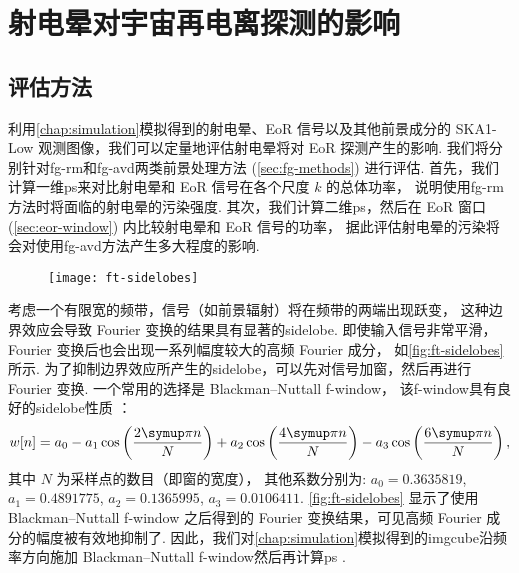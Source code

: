 
\chapter{射电晕对宇宙再电离探测的影响}
\label{chap:halo}

\section{评估方法}
\label{sec:eval-method}

利用\autoref{chap:simulation}模拟得到的射电晕、EoR 信号以及其他前景成分的
SKA1-Low 观测图像，我们可以定量地评估射电晕将对 EoR 探测产生的影响.
我们将分别针对\ac{fg-rm}和\ac{fg-avd}两类前景处理方法 (\autoref{sec:fg-methods})
进行评估.
首先，我们计算一维\ac{ps}来对比射电晕和 EoR 信号在各个尺度 $k$ 的总体功率，
说明使用\ac{fg-rm}方法时将面临的射电晕的污染强度.
其次，我们计算二维\ac{ps}，然后在 EoR 窗口 (\autoref{sec:eor-window})
内比较射电晕和 EoR 信号的功率，
据此评估射电晕的污染将会对使用\ac{fg-avd}方法产生多大程度的影响.

\begin{figure}[htp]
  \centering
  \texttt{[image: ft-sidelobes]}
  \label{fig:ft-sidelobes}
\end{figure}

考虑一个有限宽的频带，信号（如前景辐射）将在频带的两端出现跃变，
这种边界效应会导致 Fourier 变换的结果具有显著的\ac{sidelobe}.
即使输入信号非常平滑，Fourier 变换后也会出现一系列幅度较大的高频 Fourier 成分，
如\autoref{fig:ft-sidelobes} 所示.
为了抑制边界效应所产生的\ac{sidelobe}，可以先对信号加窗，然后再进行 Fourier 变换.
一个常用的选择是 Blackman--Nuttall \ac{f-window}，
该\ac{f-window}具有良好的\ac{sidelobe}性质 \cite{nuttall1981}：
\begin{equation}
  \label{eq:bn-window}
  w[n] = a_0 - a_1 \cos\left(\frac{2\Cpi n}{N}\right)
    + a_2 \cos\left(\frac{4\Cpi n}{N}\right)
    - a_3 \cos\left(\frac{6\Cpi n}{N}\right) ,
\end{equation}
其中
$N$ 为采样点的数目（即窗的宽度），
其他系数分别为:
$a_0 = \num{0.3635819}$,
$a_1 = \num{0.4891775}$,
$a_2 = \num{0.1365995}$,
$a_3 = \num{0.0106411}$.
\autoref{fig:ft-sidelobes} 显示了使用 Blackman--Nuttall \ac{f-window}
之后得到的 Fourier 变换结果，可见高频 Fourier 成分的幅度被有效地抑制了.
因此，我们对\autoref{chap:simulation}模拟得到的\ac{imgcube}沿频率方向施加
Blackman--Nuttall \ac{f-window}然后再计算\ac{ps}
\cite{trott2015,chapman2016}.


